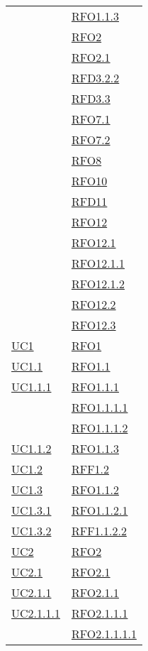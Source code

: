 \begin{longtable}{|>{\centering}m{5cm}|m{5cm}<{\centering}|}
& \hyperlink{RFO1.1.3}{RFO1.1.3}\\
& \hyperlink{RFO2}{RFO2}\\
& \hyperlink{RFO2.1}{RFO2.1}\\
& \hyperlink{RFD3.2.2}{RFD3.2.2}\\
& \hyperlink{RFD3.3}{RFD3.3}\\
& \hyperlink{RFO7.1}{RFO7.1}\\
& \hyperlink{RFO7.2}{RFO7.2}\\
& \hyperlink{RFO8}{RFO8}\\
& \hyperlink{RFO10}{RFO10}\\
& \hyperlink{RFD11}{RFD11}\\
& \hyperlink{RFO12}{RFO12}\\
& \hyperlink{RFO12.1}{RFO12.1}\\
& \hyperlink{RFO12.1.1}{RFO12.1.1}\\
& \hyperlink{RFO12.1.2}{RFO12.1.2}\\
& \hyperlink{RFO12.2}{RFO12.2}\\
& \hyperlink{RFO12.3}{RFO12.3}\\ \hline
\hyperref[UC1]{UC1} & \hyperlink{RFO1}{RFO1}\\ \hline
\hyperref[UC1.1]{UC1.1} & \hyperlink{RFO1.1}{RFO1.1}\\ \hline
\hyperref[UC1.1.1]{UC1.1.1} & \hyperlink{RFO1.1.1}{RFO1.1.1}\\
& \hyperlink{RFO1.1.1.1}{RFO1.1.1.1}\\
& \hyperlink{RFO1.1.1.2}{RFO1.1.1.2}\\ \hline
\hyperref[UC1.1.2]{UC1.1.2} & \hyperlink{RFO1.1.3}{RFO1.1.3}\\ \hline
\hyperref[UC1.2]{UC1.2} & \hyperlink{RFF1.2}{RFF1.2}\\ \hline
\hyperref[UC1.3]{UC1.3} & \hyperlink{RFO1.1.2}{RFO1.1.2}\\ \hline
\hyperref[UC1.3.1]{UC1.3.1} & \hyperlink{RFO1.1.2.1}{RFO1.1.2.1}\\ \hline
\hyperref[UC1.3.2]{UC1.3.2} & \hyperlink{RFF1.1.2.2}{RFF1.1.2.2}\\ \hline
\hyperref[UC2]{UC2} & \hyperlink{RFO2}{RFO2}\\ \hline
\hyperref[UC2.1]{UC2.1} & \hyperlink{RFO2.1}{RFO2.1}\\ \hline
\hyperref[UC2.1.1]{UC2.1.1} & \hyperlink{RFO2.1.1}{RFO2.1.1}\\ \hline
\hyperref[UC2.1.1.1]{UC2.1.1.1} & \hyperlink{RFO2.1.1.1}{RFO2.1.1.1}\\
& \hyperlink{RFO2.1.1.1.1}{RFO2.1.1.1.1}\\

\end{longtable}
